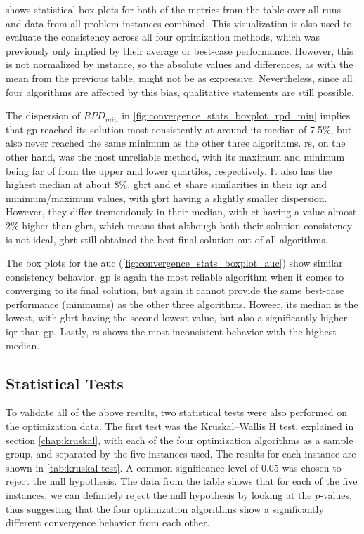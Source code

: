  shows statistical box plots for both of the metrics from the table over all runs and data from all problem instances combined. This visualization is also used to evaluate the consistency across all four optimization methods, which was previously only implied by their average or best-case performance. However, this is not normalized by instance, so the absolute values and differences, as with the mean from the previous table, might not be as expressive. Nevertheless, since all four algorithms are affected by this bias, qualitative statements are still possible.

The dispersion of $RPD_{min}$ in \cref{fig:convergence_stats_boxplot_rpd_min} implies that \gls{gp} reached its solution most consistently at around its median of 7.5\%, but also never reached the same minimum as the other three algorithms. \gls{rs}, on the other hand, was the most unreliable method, with its maximum and minimum being far of from the upper and lower quartiles, respectively. It also has the highest median at about 8\%. \gls{gbrt} and \gls{et} share similarities in their \gls{iqr} and minimum/maximum values, with \gls{gbrt} having a slightly smaller dispersion. However, they differ tremendously in their median, with \gls{et} having a value almost 2\% higher than \gls{gbrt}, which means that although both their solution consistency is not ideal, \gls{gbrt} still obtained the best final solution out of all algorithms.

The box plots for the \gls{auc} (\cref{fig:convergence_stats_boxplot_auc}) show similar consistency behavior. \gls{gp} is again the most reliable algorithm when it comes to converging to its final solution, but again it cannot provide the same best-case performance (minimums) as the other three algorithms. Howeer, its median is the lowest, with \gls{gbrt} having the second lowest value, but also a significantly higher \gls{iqr} than \gls{gp}. Lastly, \gls{rs} shows the most inconsistent behavior with the highest median. 

\subsection{Statistical Tests}

To validate all of the above results, two statistical tests were also performed on the optimization data. The first test was the Kruskal–Wallis H test, explained in section \cref{chap:kruskal}, with each of the four optimization algorithms as a sample group, and separated by the five instances used. The results for each instance are shown in \cref{tab:kruskal-test}. A common significance level of 0.05 was chosen to reject the null hypothesis. The data from the table shows that for each of the five instances, we can definitely reject the null hypothesis by looking at the $p$-values, thus suggesting that the four optimization algorithms show a significantly different convergence behavior from each other. 

